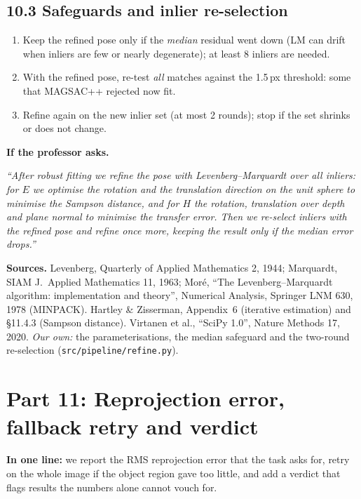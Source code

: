 \documentclass[11pt,a4paper]{article}
\newenvironment{viva}{\par\medskip\noindent\colorbox{gray!12}{\parbox{\dimexpr\linewidth-2\fboxsep}{\textbf{If the professor asks.}\ }}\par\begingroup\itshape}{\endgroup\par\medskip}
\begin{document}
\subsection*{10.3 Safeguards and inlier re-selection}
\begin{enumerate}
  \item Keep the refined pose only if the \emph{median} residual went down (LM can drift when inliers are few or nearly degenerate); at least 8 inliers are needed.
  \item With the refined pose, re-test \emph{all} matches against the 1.5\,px threshold: some that MAGSAC++ rejected now fit.
  \item Refine again on the new inlier set (at most 2 rounds); stop if the set shrinks or does not change.
\end{enumerate}

\begin{viva}
``After robust fitting we refine the pose with Levenberg--Marquardt over all inliers: for $E$ we optimise the rotation and the translation direction on the unit sphere to minimise the Sampson distance, and for $H$ the rotation, translation over depth and plane normal to minimise the transfer error. Then we re-select inliers with the refined pose and refine once more, keeping the result only if the median error drops.''
\end{viva}

\noindent\textbf{Sources.} Levenberg, Quarterly of Applied Mathematics 2, 1944; Marquardt, SIAM J.\ Applied Mathematics 11, 1963; Mor\'e, ``The Levenberg--Marquardt algorithm: implementation and theory'', Numerical Analysis, Springer LNM 630, 1978 (MINPACK). Hartley \& Zisserman, Appendix~6 (iterative estimation) and \S11.4.3 (Sampson distance). Virtanen et al., ``SciPy 1.0'', Nature Methods 17, 2020. \emph{Our own:} the parameterisations, the median safeguard and the two-round re-selection (\texttt{src/pipeline/refine.py}).

\section*{Part 11: Reprojection error, fallback retry and verdict}

\textbf{In one line:} we report the RMS reprojection error that the task asks for, retry on the whole image if the object region gave too little, and add a verdict that flags results the numbers alone cannot vouch for.
\end{document}
